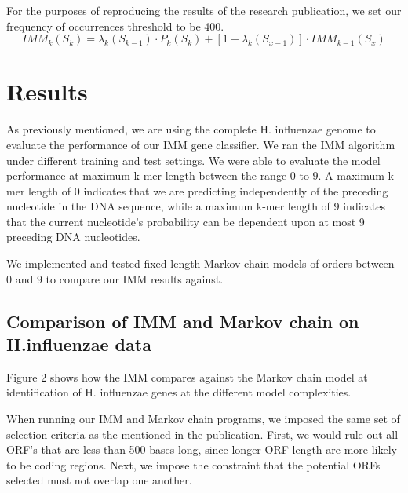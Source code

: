 \documentclass[11pt,letterpaper]{article}
\begin{document}
For the purposes of reproducing the results of the research publication, we set our frequency of occurrences threshold to be 400. 
\begin{equation}
IMM_k(S_k) = \lambda_k(S_{k-1}) \cdot P_k(S_k) + [1 - \lambda_k(S_{x-1})] \cdot IMM_{k-1}(S_x)
\end{equation}


\section{Results}

As previously mentioned, we are using the complete H. influenzae genome to evaluate the performance of our IMM gene classifier. We ran the IMM algorithm under different training and test settings. We were able to evaluate the model performance at maximum k-mer length between the range 0 to 9. A maximum k-mer length of 0 indicates that we are predicting independently of the preceding nucleotide in the DNA sequence, while a maximum k-mer length of 9 indicates that the current nucleotide’s probability can be dependent upon at most 9 preceding DNA nucleotides. 

We implemented and tested fixed-length Markov chain models of orders between 0 and 9 to compare our IMM results against.

\subsection{Comparison of IMM and Markov chain on H.influenzae data}
Figure 2 shows how the IMM compares against the Markov chain model at identification of H. influenzae genes at the different model complexities.

When running our IMM and Markov chain programs, we imposed the same set of selection criteria as the mentioned in the publication. First, we would rule out all ORF’s that are less than 500 bases long, since longer ORF length are more likely to be coding regions. Next, we impose the constraint that the potential ORFs selected must not overlap one another. 
\end{document}
